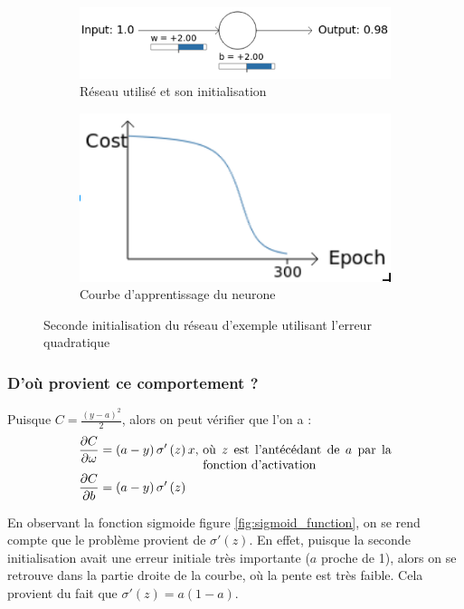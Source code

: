 \begin{figure}[h]
\centering
\begin{subfigure}{.5\textwidth}
  \centering
  \includegraphics[width=.6\linewidth]{img/entropiecroisee_reseau_utilise_init2.png}
  \caption{Réseau utilisé et son initialisation}
  \label{fig:initialisation2-entropiecroisee-schema}
\end{subfigure}%
\begin{subfigure}{.4\textwidth}
  \centering
  \includegraphics[width=.4\linewidth]{img/entropiecroisee_apprentissage2.png}
  \caption{Courbe d'apprentissage du neurone}
  \label{fig:initialisation2-entropiecroisee-courbe}
\end{subfigure}
\caption{Seconde initialisation du réseau d'exemple utilisant l'erreur quadratique}
\label{fig:initialisation2-entropiecroisee}
\end{figure}

\subsubsection{D'où provient ce comportement ?}

Puisque $C = \frac{(y-a)^2}{2}$, alors on peut vérifier que l'on a :
\begin{align}
 \frac{\partial C}{\partial \omega} &= \left(a-y\right)\sigma'\left(z\right)x \text{, \parbox[t]{15em}{où $z$ est l'antécédant de $a$ par la fonction d'activation}}\\
 \frac{\partial C}{\partial b} &= \left(a-y\right)\sigma'\left(z\right) 
\end{align}

En observant la fonction sigmoide figure \ref{fig:sigmoid_function}, on se rend compte que le problème provient de $\sigma'\left(z\right)$.
En effet, puisque la seconde initialisation avait une erreur initiale très importante ($a$ proche de 1), alors on se retrouve dans la 
partie droite de la courbe, où la pente est très faible. Cela provient du fait que $\sigma'\left(z\right) = a\left(1-a\right)$.


